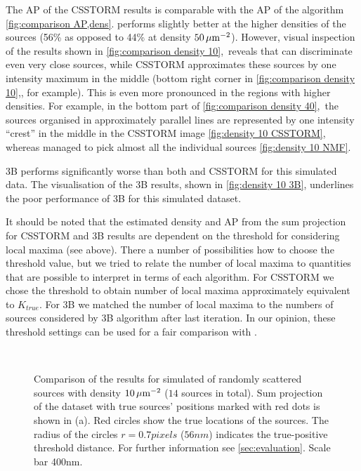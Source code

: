 The AP of the CSSTORM results is comparable with the AP of the \inmf{} algorithm \autoref{fig:comparison AP,dens}\bbb. \inmf{} performs slightly better at the higher densities of the sources (56\% as opposed to 44\% at density $50\, \mathrm{\mu m}^{-2}$). However, visual inspection of the results shown in \autoref{fig:comparison density 10}\bbb,\ccc\ reveals that \inmf{} can discriminate even very close sources, while CSSTORM approximates these sources by one intensity maximum in the middle (bottom right corner in \autoref{fig:comparison density 10}\bbb,\ccc, for example). This is even more pronounced in the regions with higher densities. For example, in the bottom part of \autoref{fig:comparison density 40}\bbb,\ccc\ the sources organised in approximately parallel lines are represented by one intensity ``crest'' in the middle in the CSSTORM image \autoref{fig:density 10 CSSTORM}, whereas \inmf{} managed to pick almost all the individual sources \autoref{fig:density 10 NMF}. 

3B performs significantly worse than both \inmf{} and CSSTORM for this simulated data. The visualisation of the 3B results, shown in \autoref{fig:density 10 3B}, underlines the poor performance of 3B for this simulated dataset.

It should be noted that the estimated density and AP from the sum projection for CSSTORM and 3B results are dependent on the threshold for considering local maxima (see above). There a number of possibilities how to choose the threshold value, but we tried to relate the number of local maxima to quantities that are possible to interpret in terms of each algorithm. For CSSTORM we chose the threshold to obtain number of local maxima approximately equivalent to $K_{true}$. For 3B we matched the number of local maxima to the numbers of sources considered by 3B algorithm after last iteration. In our opinion, these threshold settings can be used for a fair comparison with \inmf{}.
%
\begin{figure}[!p]
	\centering
	\newcommand{\sizef}{.95}
	\\
	\caption{Comparison of the results for simulated of randomly scattered sources with density $10\, \mathrm{\mu m}^{-2}$ ($14$ sources in total). Sum projection of the dataset with true sources' positions marked with red dots is shown in (a). Red circles show the true locations of the sources. The radius of the circles $r=0.7\unit{pixels}$ ($56\unit{nm}$) indicates the true-positive threshold distance. For further information see \autoref{sec:evaluation}. Scale bar 400\unit{nm}.}
	\label{fig:comparison density 10}
\end{figure}

